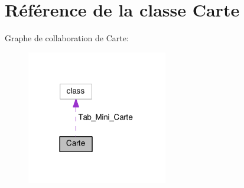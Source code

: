 \hypertarget{classCarte}{\section{Référence de la classe Carte}
\label{classCarte}
}


Graphe de collaboration de Carte\+:\nopagebreak
\begin{figure}[H]
\begin{center}
\leavevmode
\includegraphics[width=174pt]{classCarte__coll__graph}
\end{center}
\end{figure}
